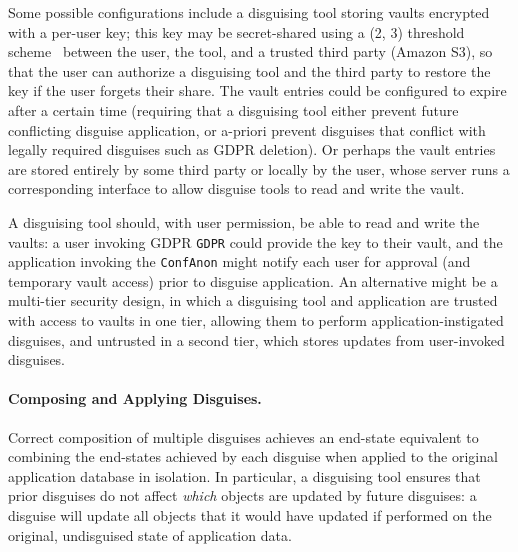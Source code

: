 %
Some possible configurations include a disguising tool storing vaults encrypted with a per-user key; this key
may be secret-shared using a (2, 3) threshold scheme~\cite{secretsharing} between the user, the
tool, and a trusted third party (\eg Amazon S3), so that the user can authorize a disguising tool and the
third party to restore the key if the user forgets their share.
%
The vault entries could be configured to expire after a certain time (requiring that a disguising tool either
prevent future conflicting disguise application, or a-priori prevent disguises that conflict with
legally required disguises such as GDPR deletion).
%
Or perhaps the vault entries are stored entirely by some third party or locally by the user, whose
server runs a corresponding interface to allow disguise tools to read and write the vault.

A disguising tool should, with user permission, be able to read and write the vaults: a user invoking GDPR
\texttt{GDPR} could provide the key to their vault, and the application invoking the
\texttt{ConfAnon} might notify each user for approval (and temporary vault access) prior to disguise
application. An alternative might be a multi-tier security design, in which a disguising tool and application
are trusted with access to vaults in one tier, allowing them to perform application-instigated
disguises, and untrusted in a second tier, which stores updates from user-invoked disguises.


\paragraph{Composing and Applying Disguises.}
Correct composition of multiple disguises achieves an end-state equivalent to combining the
end-states achieved by each disguise when applied to the original application database in isolation.
%
In particular, a disguising tool ensures that prior disguises do not affect \emph{which} objects are updated
by future disguises: a disguise will update all objects that it would have updated if performed on
the original, undisguised state of application data.

